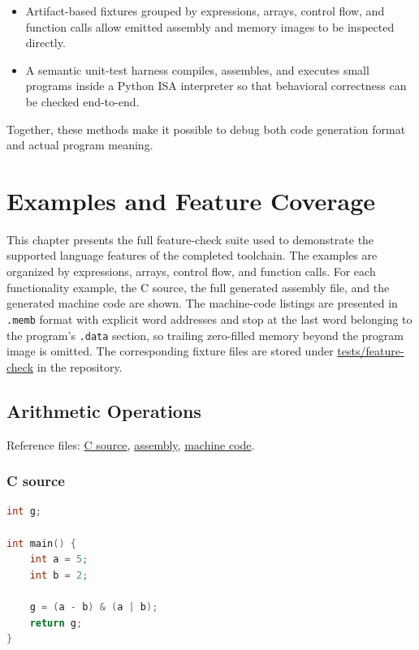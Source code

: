 \documentclass[12pt]{report}
\begin{document}
\begin{itemize}
    \item Artifact-based fixtures grouped by expressions, arrays, control flow,
          and function calls allow emitted assembly and memory images to be
          inspected directly.
    \item A semantic unit-test harness compiles, assembles, and executes small
          programs inside a Python ISA interpreter so that behavioral
          correctness can be checked end-to-end.
\end{itemize}

Together, these methods make it possible to debug both code generation format
and actual program meaning.

\chapter{Examples and Feature Coverage}

This chapter presents the full feature-check suite used to demonstrate the supported language features of the completed toolchain. The examples are organized by expressions, arrays, control flow, and function calls. For each functionality example, the C source, the full generated assembly file, and the generated machine code are shown. The machine-code listings are presented in \texttt{.memb} format with explicit word addresses and stop at the last word belonging to the program's \texttt{.data} section, so trailing zero-filled memory beyond the program image is omitted. The corresponding fixture files are stored under \href{https://github.com/shorewind/Custom-ISA-Toolchain/tree/main/tests/feature-check}{tests/feature-check} in the repository.

\section{Arithmetic Operations}
Reference files:
\href{https://github.com/shorewind/Custom-ISA-Toolchain/blob/main/tests/feature-check/expressions/arithmetic.c}{C source},
\href{https://github.com/shorewind/Custom-ISA-Toolchain/blob/main/tests/feature-check/expressions/arithmetic.s}{assembly},
\href{https://github.com/shorewind/Custom-ISA-Toolchain/blob/main/tests/feature-check/expressions/arithmetic.memb}{machine code}.

\subsection*{C source}
\begin{lstlisting}[language=C]
int g;

int main() {
    int a = 5;
    int b = 2;

    g = (a - b) & (a | b);
    return g;
}
\end{lstlisting}
\end{document}
